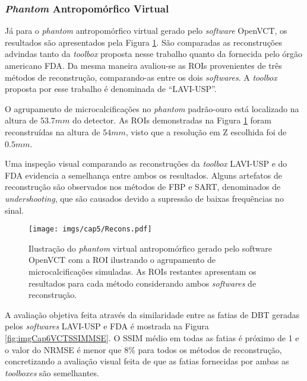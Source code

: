 \subsubsection{\textit{Phantom} Antropomórfico Virtual}
 
 Já para o \textit{phantom} antropomórfico virtual gerado pelo \textit{software} OpenVCT, os resultados são apresentados pela Figura \ref{fig:imgCap6VCT}. São comparadas as reconstruções advindas tanto da \textit{toolbox} proposta nesse trabalho quanto da fornecida pelo órgão americano \acs{FDA}. Da mesma maneira avaliou-se as \acs{ROI}s provenientes de três métodos de reconstrução, comparando-as entre os dois \textit{softwares}. A \textit{toolbox} proposta por esse trabalho é denominada de ``LAVI-USP''.
 
 O agrupamento de microcalcificações no \textit{phantom} padrão-ouro está localizado na altura de  $53.7mm$ do detector. As \acs{ROI}s demonstradas na Figura \ref{fig:imgCap6VCT} foram reconstruídas na altura de $54mm$, visto que a resolução em Z escolhida foi de $0.5mm$. 
 
 Uma inspeção visual comparando as reconstruções da \textit{toolbox} LAVI-USP e do \acs{FDA} evidencia a semelhança entre ambos os resultados. Alguns artefatos de reconstrução são observados nos métodos de \acs{FBP} e \acs{SART}, denominados de \textit{undershooting}, que são causados devido a supressão de baixas frequências no sinal.
 
 \begin{figure}[!ht]
 	\caption{Ilustração do \textit{phantom} virtual antropomórfico gerado pelo software OpenVCT com a \acs{ROI} ilustrando o agrupamento de microcalcificações simuladas. As \acs{ROI}s restantes apresentam os resultados para cada método considerando ambos \textit{softwares} de reconstrução.}
 	\begin{center}
 		\texttt{[image: imgs/cap5/Recons.pdf]}
 	\end{center}
 	\label{fig:imgCap6VCT}
 \end{figure} 

A avaliação objetiva feita através da similaridade entre as fatias de \acs{DBT} geradas pelos \textit{softwares} LAVI-USP e \acs{FDA} é mostrada na Figura \ref{fig:imgCap6VCTSSIMMSE}. O \acs{SSIM} médio em todas as fatias é próximo de 1 e o valor do \acs{NRMSE} é menor que 8\% para todos os métodos de reconstrução, concretizando a avaliação visual feita de que as fatias fornecidas por ambas as \textit{toolboxes} são semelhantes.

